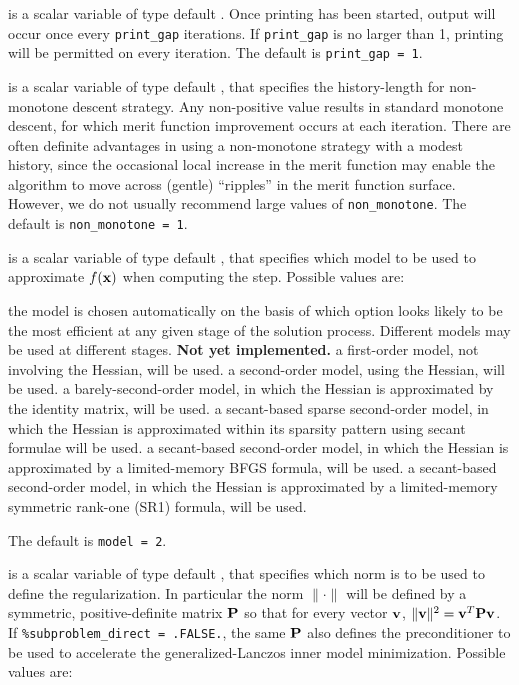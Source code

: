 \documentclass{galahad}
\begin{document}
\begin{description}
 is a scalar variable of type default \integer.
Once printing has been started, output will occur once every
{\tt print\_gap} iterations. If {\tt print\_gap} is no larger than 1,
printing will be permitted on every iteration.
The default is {\tt print\_gap = 1}.

 is a scalar variable of type default \integer, that
specifies the history-length for non-monotone descent strategy.
Any non-positive value results in standard monotone descent, for which
merit function improvement occurs at each iteration. There are often
definite advantages in using a non-monotone strategy with a modest history,
since the occasional local increase in the merit function may
enable the algorithm to move across (gentle) ``ripples'' in
the merit function surface.
However, we do not usually recommend large values of {\tt non\_monotone}.
The default is {\tt non\_monotone = 1}.

 is a scalar variable of type default \integer, that specifies
which model to be used to approximate $f({\mathbf{x}})$ when computing the step.
Possible values are:

\begin{description}
 the model is chosen automatically on the basis of which option looks
        likely to be the most efficient at any given stage of the solution
        process. Different models may be used at different stages.
        {\bf Not yet implemented.}
 a first-order model, not involving the Hessian, will be used.
 a second-order model, using the Hessian, will be used.
 a barely-second-order model, in which the Hessian is approximated
        by the identity matrix, will be used.
 a secant-based sparse second-order model, in which the Hessian is
        approximated within its sparsity pattern using secant formulae will
        be used.
 a secant-based second-order model, in which the Hessian is approximated
        by a limited-memory BFGS formula, will be used.
 a secant-based second-order model, in which the Hessian is approximated
        by a limited-memory symmetric rank-one (SR1) formula, will be used.
\end{description}
The default is {\tt model = 2}.

 is a scalar variable of type default \integer,
that specifies which norm is to be used to define the regularization.
In particular the norm $\|\cdot\|$ will be defined by a symmetric,
positive-definite matrix ${\mathbf{P}}$ so that for every vector ${\mathbf{v}}$,
$\|{\mathbf{v}}\|^2 = {\mathbf{v}}^T {\mathbf{P}} {\mathbf{v}}$.
If {\tt \%subproblem\_direct = .FALSE.}, the same ${\mathbf{P}}$ also defines the
preconditioner to be used to accelerate the generalized-Lanczos
inner model minimization.  Possible values are:


\end{description}
\end{document}
